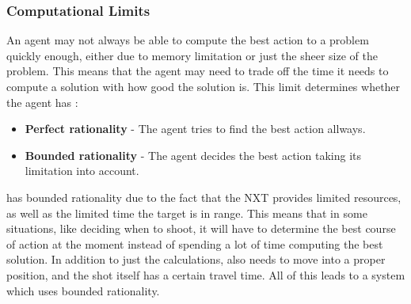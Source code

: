 \subsubsection{Computational Limits}
An agent may not always be able to compute the best action to a problem quickly
enough, either due to memory limitation or just the sheer size of the problem.
This means that the agent may need to trade off the time it needs to compute a
solution with how good the solution is. This limit determines whether the agent
has \citep[ch.1.5.8]{MIBook}:

\begin{itemize}
  \item \textbf{Perfect rationality} - The agent tries to find the best action
  allways.
  \item \textbf{Bounded rationality} - The agent decides the best action taking
  its limitation into account.
\end{itemize}

\name has bounded rationality due to the fact that the NXT provides limited
resources, as well as the limited time the target is in range. This means that
in some situations, like deciding when to shoot, it will have to determine the
best course of action at the moment instead of spending a lot of time computing
the best solution. In addition to just the calculations, \name also needs to
move into a proper position, and the shot itself has a certain travel time. All
of this leads to a system which uses bounded rationality.

